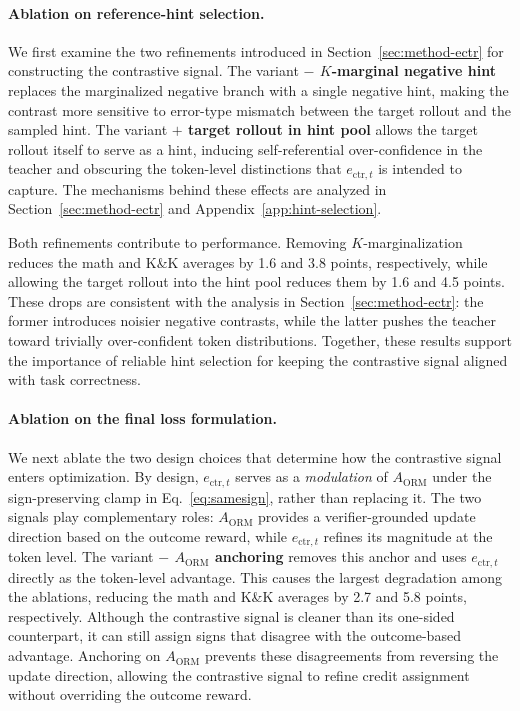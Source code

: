 \paragraph{Ablation on reference-hint selection.}
We first examine the two refinements introduced in Section~\ref{sec:method-ectr} for constructing the contrastive signal. The variant \textbf{$-$ $K$-marginal negative hint} replaces the marginalized negative branch with a single negative hint, making the contrast more sensitive to error-type mismatch between the target rollout and the sampled hint. The variant \textbf{$+$ target rollout in hint pool} allows the target rollout itself to serve as a hint, inducing self-referential over-confidence in the teacher and obscuring the token-level distinctions that $e_{\mathrm{ctr},t}$ is intended to capture. The mechanisms behind these effects are analyzed in Section~\ref{sec:method-ectr} and Appendix~\ref{app:hint-selection}.

Both refinements contribute to performance. Removing $K$-marginalization reduces the math and K\&K averages by 1.6 and 3.8 points, respectively, while allowing the target rollout into the hint pool reduces them by 1.6 and 4.5 points. These drops are consistent with the analysis in Section~\ref{sec:method-ectr}: the former introduces noisier negative contrasts, while the latter pushes the teacher toward trivially over-confident token distributions. Together, these results support the importance of reliable hint selection for keeping the contrastive signal aligned with task correctness.

\paragraph{Ablation on the final loss formulation.}
We next ablate the two design choices that determine how the contrastive signal enters optimization. By design, $e_{\mathrm{ctr},t}$ serves as a \emph{modulation} of $A_{\mathrm{ORM}}$ under the sign-preserving clamp in Eq.~\ref{eq:samesign}, rather than replacing it. The two signals play complementary roles: $A_{\mathrm{ORM}}$ provides a verifier-grounded update direction based on the outcome reward, while $e_{\mathrm{ctr},t}$ refines its magnitude at the token level. The variant \textbf{$-$ $A_{\mathrm{ORM}}$ anchoring} removes this anchor and uses $e_{\mathrm{ctr},t}$ directly as the token-level advantage. This causes the largest degradation among the ablations, reducing the math and K\&K averages by 2.7 and 5.8 points, respectively. Although the contrastive signal is cleaner than its one-sided counterpart, it can still assign signs that disagree with the outcome-based advantage. Anchoring on $A_{\mathrm{ORM}}$ prevents these disagreements from reversing the update direction, allowing the contrastive signal to refine credit assignment without overriding the outcome reward.

